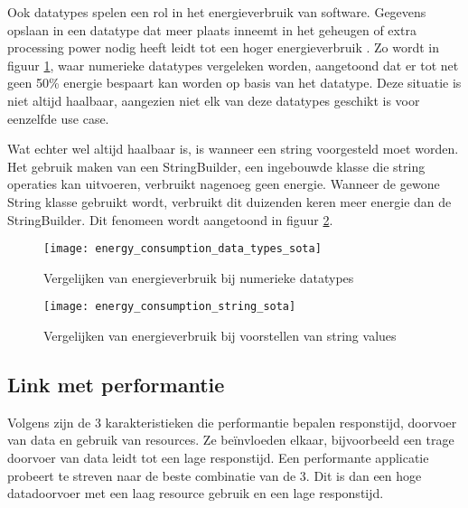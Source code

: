 Ook datatypes spelen een rol in het energieverbruik van software. Gegevens opslaan in een datatype dat meer plaats inneemt in het geheugen of extra processing power nodig heeft leidt tot een hoger energieverbruik \autocite{Dutta2023}. Zo wordt in figuur \ref{energy_consumption_data_types_sota}, waar numerieke datatypes vergeleken worden, aangetoond dat er tot net geen 50\% energie bespaart kan worden op basis van het datatype. Deze situatie is niet altijd haalbaar, aangezien niet elk van deze datatypes geschikt is voor eenzelfde use case. 

\bigskip

Wat echter wel altijd haalbaar is, is wanneer een string voorgesteld moet worden. Het gebruik maken van een StringBuilder, een ingebouwde klasse die string operaties kan uitvoeren, verbruikt nagenoeg geen energie. Wanneer de gewone String klasse gebruikt wordt, verbruikt dit duizenden keren meer energie dan de StringBuilder. Dit fenomeen wordt aangetoond in figuur \ref{energy_consumption_string_sota}. 

\bigskip


\begin{figure}[H]
    \texttt{[image: energy\_consumption\_data\_types\_sota]}
    \caption[Energieverbruik numerieke datatypes]{Vergelijken van energieverbruik bij numerieke datatypes \autocite{Dutta2023}}
    \label{energy_consumption_data_types_sota}
\end{figure}


\begin{figure}[H]
    \texttt{[image: energy\_consumption\_string\_sota]}
    \centering
    \caption[Energieverbruik string voorstelling]{Vergelijken van energieverbruik bij voorstellen van string values \autocite{Dutta2023}}
    \label{energy_consumption_string_sota}

\end{figure}


\subsection{Link met performantie}
Volgens \textcite{Lubomski2020} zijn de 3 karakteristieken die performantie bepalen responstijd, doorvoer van data en gebruik van resources. Ze beïnvloeden elkaar, bijvoorbeeld een trage doorvoer van data leidt tot een lage responstijd. Een performante applicatie probeert te streven naar de beste combinatie van de 3. Dit is dan een hoge datadoorvoer met een laag resource gebruik en een lage responstijd. 

